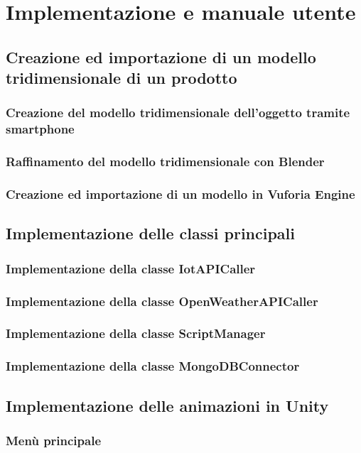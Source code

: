 \chapter{Implementazione e manuale utente}

\section{Creazione ed importazione di un modello tridimensionale di un prodotto}
\subsection{Creazione del modello tridimensionale dell'oggetto tramite smartphone}
\subsection{Raffinamento del modello tridimensionale con Blender}
\subsection{Creazione ed importazione di un modello in Vuforia Engine}

\section{Implementazione delle classi principali}
\subsection{Implementazione della classe IotAPICaller}
\subsection{Implementazione della classe OpenWeatherAPICaller}
\subsection{Implementazione della classe ScriptManager}
\subsection{Implementazione della classe MongoDBConnector}

\section{Implementazione delle animazioni in Unity}
\subsection{Menù principale}
